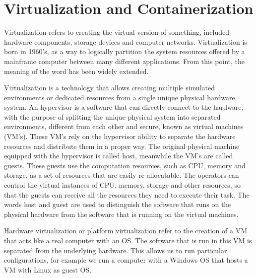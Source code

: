 \section{Virtualization and Containerization}
Virtualization refers to creating the virtual version of something, included hardware components, storage devices and computer networks.
Virtualization is born in 1960's, as a way to logically partition the system resources offered by a mainframe computer between many different applications. From this point, the meaning of the word has been widely extended.

Virtualization is a technology that allows creating multiple simulated environments or dedicated resources from a single unique physical hardware system. An hypervisor is a software that can directly connect to the hardware, with the purpose of splitting the unique physical system into separated environments, different from each other and secure, known as virtual machines (VM's). These VM's rely on the hypervisor ability to separate the hardware resources and distribute them in a proper way. The original physical machine equipped with the hypervisor is called host, meanwhile the VM's are called guests. These guests use the computation  resources, such as CPU, memory and storage, as a set of resources that are easily re-allocatable. The operators can control the virtual instances of CPU, memory, storage and other resources, so that the guests can receive all the resources they need to execute their task. The words host and guest are used to distinguish the software that runs on the physical hardware from the software that is running on the virtual machines.

Hardware virtualization or platform virtualization refer to the creation of a VM that acts like a real computer with an OS. The software that is run in this VM is separated from the underlying hardware.
This allows us to run particular configurations, for example we run a
computer with a Windows OS that hosts a VM with Linux as guest OS.

